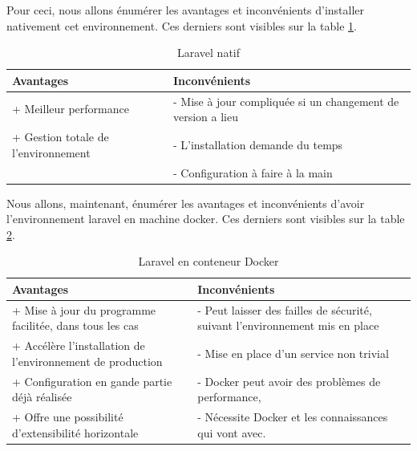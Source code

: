 \documentclass[
    iai, %
    il, %
]{heig-tb}
\begin{document}
Pour ceci, nous allons énumérer les avantages et inconvénients d'installer nativement cet
environnement. Ces derniers sont visibles sur la table \ref{prod-laravel-native}.

\begin{table}[h]
    \begin{center}
        \caption{Laravel natif \label{prod-laravel-native}}
        \begin{tabularx}{1.0\textwidth} {X|X}
            Avantages                           & Inconvénients                                               \\ \hline
            + Meilleur performance              & - Mise à jour compliquée si un changement de version a lieu \\
            + Gestion totale de l'environnement & - L'installation demande du temps                           \\
                                                & - Configuration à faire à la main                           \\
        \end{tabularx}
    \end{center}
\end{table}

Nous allons, maintenant, énumérer les avantages et inconvénients d'avoir l'environnement \Gls{laravel}
en machine \Gls{docker}. Ces derniers sont visibles sur la table \ref{prod-laravel-docker}.

\begin{table}[h]
    \begin{center}
        \caption{Laravel en conteneur Docker \label{prod-laravel-docker}}
        \begin{tabularx}{1.0\textwidth} {X|X}
            Avantages                                                  & Inconvénients                        \\ \hline
            + Mise à jour du programme facilitée, dans tous les cas    & - Peut laisser des failles de
            sécurité, suivant l'environnement mis en place                                                    \\
            + Accélère l'installation de l'environnement de production & - Mise en place d'un service
            non trivial                                                                                       \\
            + Configuration en gande partie déjà réalisée              & - Docker peut avoir des problèmes de
            performance, \cite{labrecque}                                                                     \\
            + Offre une possibilité d'extensibilité horizontale        & - Nécessite Docker et les
            connaissances qui vont avec. \cite{labrecque}                                                     \\
        \end{tabularx}
    \end{center}
\end{table}
\end{document}
